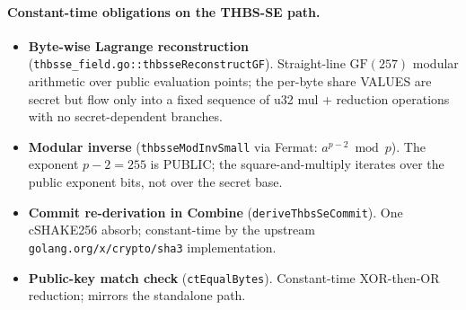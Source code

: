 \paragraph{Constant-time obligations on the THBS-SE path.}
\begin{itemize}[leftmargin=2em,nosep]
  \item \textbf{Byte-wise Lagrange reconstruction}
        (\texttt{thbsse\_field.go::thbsseReconstructGF}).
        Straight-line $\mathrm{GF}(257)$ modular arithmetic over
        public evaluation points; the per-byte share VALUES are
        secret but flow only into a fixed sequence of u32 mul +
        reduction operations with no secret-dependent branches.
  \item \textbf{Modular inverse}
        (\texttt{thbsseModInvSmall} via Fermat: $a^{p-2}
        \bmod p$). The exponent $p - 2 = 255$ is PUBLIC; the
        square-and-multiply iterates over the public exponent
        bits, not over the secret base.
  \item \textbf{Commit re-derivation in Combine}
        (\texttt{deriveThbsSeCommit}). One cSHAKE256 absorb;
        constant-time by the upstream
        \texttt{golang.org/x/crypto/sha3} implementation.
  \item \textbf{Public-key match check}
        (\texttt{ctEqualBytes}). Constant-time XOR-then-OR
        reduction; mirrors the standalone path.
\end{itemize}
